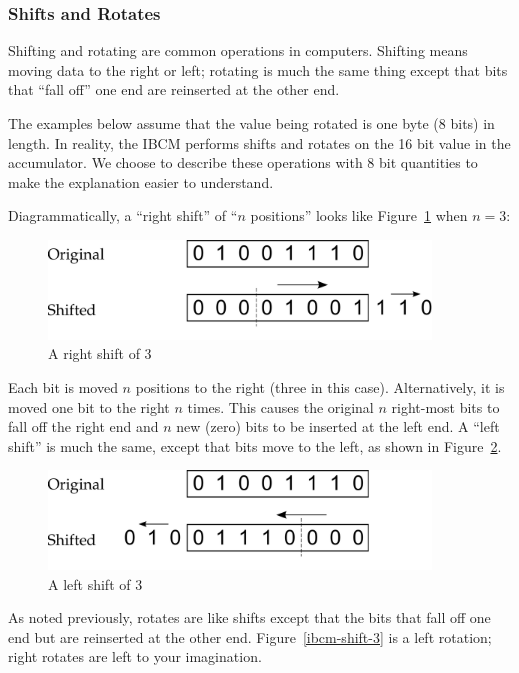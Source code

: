 \subsubsection{Shifts and Rotates}

Shifting and rotating are common operations in computers. Shifting
means moving data to the right or left; rotating is much the same
thing except that bits that ``fall off'' one end are reinserted at the
other end.

The examples below assume that the value being rotated is one byte (8
bits) in length. In reality, the IBCM performs shifts and rotates on
the 16 bit value in the accumulator.  We choose to describe these
operations with 8 bit quantities to make the explanation easier to
understand.

Diagrammatically, a ``right shift'' of ``$n$ positions'' looks like
Figure~\ref{ibcm-shift-1} when $n = 3$:

\begin{figure}[h]
\centering
\includegraphics[width=4in]{ibcm/ibcm-shift-1.pdf}
\caption{A right shift of 3}
\label{ibcm-shift-1}
\end{figure}

Each bit is moved $n$ positions to the right (three in this case).
Alternatively, it is moved one bit to the right $n$ times. This causes
the original $n$ right-most bits to fall off the right end and $n$ new
(zero) bits to be inserted at the left end. A ``left shift'' is much
the same, except that bits move to the left, as shown in
Figure~\ref{ibcm-shift-2}.

\begin{figure}[h]
\centering
\includegraphics[width=4in]{ibcm/ibcm-shift-2.pdf}
\caption{A left shift of 3}
\label{ibcm-shift-2}
\end{figure}

As noted previously, rotates are like shifts except that the bits that
fall off one end but are reinserted at the other end.
Figure~\ref{ibcm-shift-3} is a left rotation; right rotates are left
to your imagination.

